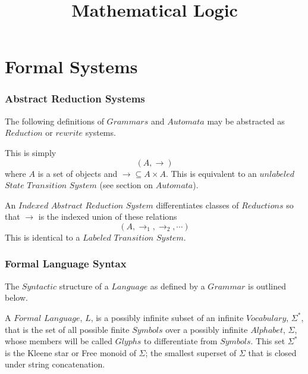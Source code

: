 \documentclass{article}
\begin{document}
\setcounter{secnumdepth}{5}
\setcounter{tocdepth}{5}


\title{Mathematical Logic}
\date{}
\maketitle


\tableofcontents


\part{Formal Systems}

\section{Abstract Reduction Systems}
The following definitions of $Grammars$ and $Automata$ may be
abstracted as $Reduction$ or $rewrite$ systems.

This is simply
    \[(A,\rightarrow)\]
where $A$ is a set of objects and $\rightarrow \subseteq A \times
A$. This is equivalent to an $unlabeled$ $State$ $Transition$ $System$
(see section on $Automata$).

An $Indexed$ $Abstract$ $Reduction$ $System$ differentiates classes of
$Reductions$ so that $\rightarrow$ is the indexed union of these
relations
    \[(A, \rightarrow_1, \rightarrow_2, \cdots)\]
This is identical to a $Labeled$ $Transition$ $System$.

\section{Formal Language Syntax}

The $Syntactic$ structure of a $Language$ as defined by a $Grammar$ is
outlined below.

A $Formal$ $Language$, $L$, is a possibly infinite subset of an
infinite $Vocabulary$, $\Sigma^*$, that is the set of all possible
finite $Symbols$ over a possibly infinite $Alphabet$, $\Sigma$, whose
members will be called $Glyphs$ to differentiate from $Symbols$. This
set $\Sigma^*$ is the Kleene star or Free monoid of $\Sigma$; the
smallest superset of $\Sigma$ that is closed under string
concatenation.
\end{document}
